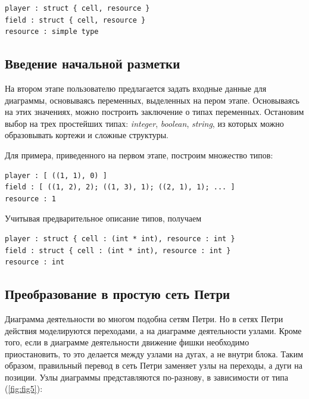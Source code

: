 \begin{lstlisting}[style=grammar,basicstyle=\small]
player : struct { cell, resource }
field : struct { cell, resource }
resource : simple type
\end{lstlisting}

\subsection{Введение начальной разметки}

На втором этапе пользователю предлагается задать входные данные для диаграммы, основываясь переменных, выделенных на пером этапе. Основываясь на этих значениях, можно построить заключение о типах переменных. Остановим выбор на трех простейших типах: \textit{integer}, \textit{boolean}, \textit{string}, из которых можно образовывать кортежи и сложные структуры.

Для примера, приведенного на первом этапе, построим множество типов:

\begin{lstlisting}[style=grammar,basicstyle=\small]
player : [ ((1, 1), 0) ]
field : [ ((1, 2), 2); ((1, 3), 1); ((2, 1), 1); ... ]
resource : 1
\end{lstlisting}

Учитывая предварительное описание типов, получаем

\begin{lstlisting}[style=grammar,basicstyle=\small]
player : struct { cell : (int * int), resource : int }
field : struct { cell : (int * int), resource : int }
resource : int
\end{lstlisting}

\subsection{Преобразование в простую сеть Петри}

Диаграмма деятельности во многом подобна сетям Петри. Но в сетях Петри действия моделируются переходами, а на диаграмме деятельности узлами. Кроме того, если в диаграмме деятельности движение фишки необходимо приостановить, то это делается между узлами на дугах, а не внутри блока. Таким образом, правильный перевод в сеть Петри заменяет узлы на переходы, а дуги на позиции. Узлы диаграммы представляются по-разнову, в зависимости от типа (\ref{fig:fig5}):

